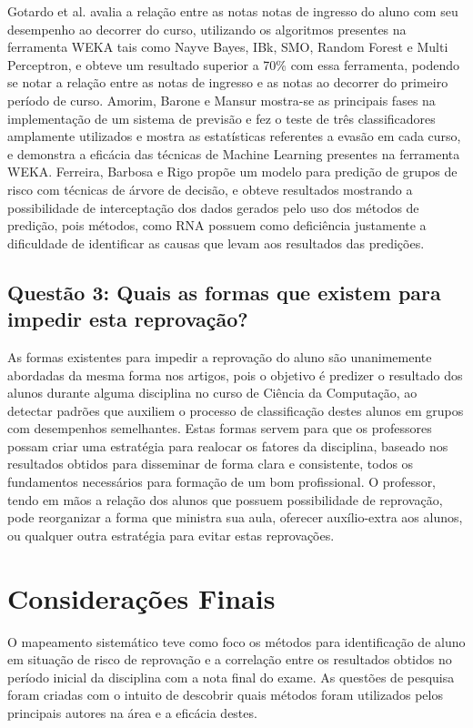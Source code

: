 \documentclass[12pt]{article}
\begin{document}
Gotardo et al. \cite{Gotardo2013} avalia a relação entre as notas notas de ingresso do aluno com seu desempenho ao decorrer do curso, utilizando os algoritmos presentes na ferramenta WEKA tais como Nayve Bayes, IBk, SMO, Random Forest e Multi Perceptron, e obteve um resultado superior a 70\% com essa ferramenta, podendo se notar a relação entre as notas de ingresso e as notas ao decorrer do primeiro período de curso. Amorim, Barone e Mansur \cite{Amorim2008} mostra-se as principais fases na implementação de um sistema de previsão e fez o teste de três classificadores amplamente utilizados e mostra as estatísticas referentes a evasão em cada curso, e demonstra a eficácia das técnicas de Machine Learning presentes na ferramenta WEKA. Ferreira, Barbosa e Rigo \cite{Ferreira2016} propõe um modelo para predição de grupos de risco com técnicas de árvore de decisão, e obteve resultados mostrando a possibilidade de interceptação dos dados gerados pelo uso dos métodos de predição, pois métodos, como RNA possuem como deficiência justamente a dificuldade de identificar as causas que levam aos resultados das predições.

\subsection{\textbf{Questão 3: Quais as formas que existem para impedir esta reprovação?}}
As formas existentes para impedir a reprovação do aluno são unanimemente abordadas da mesma forma nos artigos, pois o objetivo é predizer o resultado dos alunos durante alguma disciplina no curso de Ciência da Computação, ao detectar padrões que auxiliem o processo de classificação destes alunos em grupos com desempenhos semelhantes. Estas formas servem para que os professores possam criar uma estratégia para realocar os fatores da disciplina, baseado nos resultados obtidos para disseminar de forma clara e consistente, todos os fundamentos necessários para formação de um bom profissional. O professor, tendo em mãos a relação dos alunos que possuem possibilidade de reprovação, pode reorganizar a forma que ministra sua aula, oferecer auxílio-extra aos alunos, ou qualquer outra estratégia para evitar estas reprovações.

\section{Considerações Finais} \label{sec:consideracoes}

O mapeamento sistemático teve como foco os métodos para identificação de aluno em situação de risco de reprovação e a correlação entre os resultados obtidos no período inicial da disciplina com a nota final do exame. As questões de pesquisa foram criadas com o intuito de descobrir quais métodos foram utilizados pelos principais autores na área e a eficácia destes. 
\end{document}
